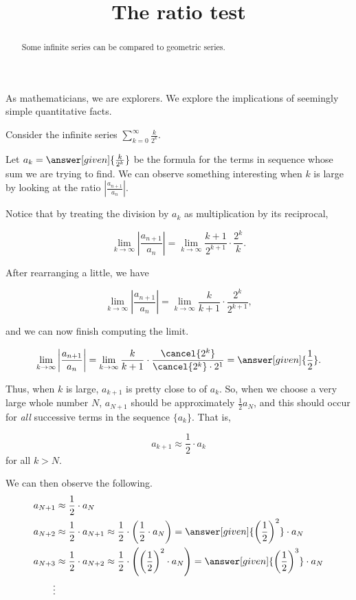 \documentclass{ximera}
\title[Dig-In:]{The ratio test}
\begin{document}
\begin{abstract}
Some infinite series can be compared to geometric series.
\end{abstract}
\maketitle

As mathematicians, we are explorers. We explore the implications of
seemingly simple quantitative facts. 

\begin{exploration}
Consider the infinite series $\sum_{k=0}^\infty \frac{k}{2^k}$. 

Let $a_k = \answer[given]{\frac{k}{2^k}}$ be the formula for the terms in sequence whose sum we are trying to find.  We can observe something interesting when $k$ is large by looking at the ratio $\left|\frac{a_{n+1}}{a_n}\right|$.

Notice that by treating the division by $a_k$ as multiplication by its reciprocal, 

\[
\lim_{k \to \infty} \left|\frac{a_{n+1}}{a_n}\right| = \lim_{k \to \infty} \frac{k+1}{2^{k+1}} \cdot \frac{2^k}{k}.
\]

After rearranging a little, we have

\[
\lim_{k \to \infty} \left|\frac{a_{n+1}}{a_n}\right| = \lim_{k \to \infty} \frac{k}{k+1} \cdot \frac{2^k}{2^{k+1}},
\]

and we can now finish computing the limit.

\[
\lim_{k \to \infty} \left|\frac{a_{n+1}}{a_n}\right| = \lim_{k \to \infty} \frac{k}{k+1} \cdot \frac{\cancel{2^k}}{\cancel{2^k} \cdot 2^1} = \answer[given]{\frac{1}{2}}.
\]

Thus, when $k$ is large, $a_{k+1}$ is pretty close to
 of $a_{k}$.  
So, when we choose a very large whole number $N$, $a_{N+1}$ should be approximately $\frac{1}{2} a_N$, and this should occur for \emph{all} successive terms in the sequence $\{a_k\}$.  That is, 

\[
a_{k+1} \approx  \frac{1}{2} \cdot a_k
\]
for all $k>N$.

We can then observe the following.
\begin{align*}
  a_{N+1} &\approx  \frac{1}{2} \cdot a_N \\
  a_{N+2} &\approx  \frac{1}{2} \cdot a_{N+1}  \approx \frac{1}{2} \cdot \left(\frac{1}{2} \cdot a_N\right) = \answer[given]{\left(\frac{1}{2}\right)^2} \cdot a_N \\
  a_{N+3} &\approx  \frac{1}{2} \cdot a_{N+2}  \approx \frac{1}{2} \cdot \left( \left(\frac{1}{2}\right)^2 \cdot a_N\right) = \answer[given]{\left(\frac{1}{2}\right)^3} \cdot a_N \\
\vdots
\end{align*}


\end{exploration}
\end{document}
